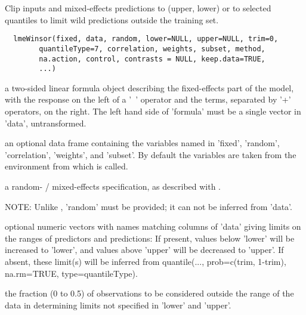 \documentclass{article}
\begin{document}
\begin{Description}\relax
Clip inputs and mixed-effects predictions to (upper, lower) or to
selected quantiles to limit wild predictions outside the training
set.
\end{Description}
\begin{Usage}
\begin{verbatim}
  lmeWinsor(fixed, data, random, lower=NULL, upper=NULL, trim=0,
        quantileType=7, correlation, weights, subset, method,
        na.action, control, contrasts = NULL, keep.data=TRUE, 
        ...)
\end{verbatim}
\end{Usage}
\begin{Arguments}
\begin{ldescription}
\item[\code{fixed}] a two-sided linear formula object describing the fixed-effects part
of the model, with the response on the left of a '~' operator and
the terms, separated by '+' operators, on the right.  The left hand
side of 'formula' must be a single vector in 'data', untransformed.

\item[\code{data}] an optional data frame containing the variables named in 'fixed',
'random', 'correlation', 'weights', and 'subset'.  By default the
variables are taken from the environment from which 
is  called. 

\item[\code{random}] a random- / mixed-effects specification, as described with
.

NOTE:  Unlike , 'random' must be provided;  it can
not be inferred from 'data'.  

\item[\code{lower, upper}] optional numeric vectors with names matching columns of 'data'
giving limits on the ranges of predictors and predictions:  If
present, values below 'lower' will be increased to 'lower', and
values above 'upper' will be decreased to 'upper'.  If absent, these
limit(s) will be inferred from quantile(..., prob=c(trim, 1-trim),
na.rm=TRUE, type=quantileType).  

\item[\code{trim}] the fraction (0 to 0.5) of observations to be considered outside the
range of the data in determining limits not specified in 'lower' and
'upper'.  


\end{ldescription}
\end{Arguments}
\end{document}
